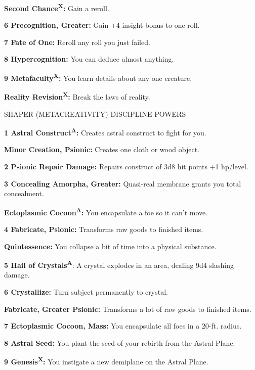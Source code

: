 \documentclass{article}
\begin{document}
\parindent=0pt
\textbf{Second Chance}\textsuperscript{\textbf{X}}\textbf{:} Gain a reroll.

\parindent=-15pt
\textbf{6 Precognition, Greater:} Gain +4 insight bonus to one roll.

\textbf{7 Fate of One:} Reroll any roll you just failed.

\textbf{8 Hypercognition:} You can deduce almost anything.

\textbf{9 Metafaculty}\textsuperscript{\textbf{X}}\textbf{:} You learn details 
about any one creature.

\parindent=0pt
\textbf{Reality Revision}\textsuperscript{\textbf{X}}\textbf{:} Break the laws 
of reality.

\vspace{12pt}
\parindent=-15pt
SHAPER (METACREATIVITY) DISCIPLINE POWERS

\textbf{1  Astral Construct}\textsuperscript{\textbf{A}}\textbf{:} Creates astral 
construct to fight for you.

\parindent=0pt
\textbf{Minor Creation, Psionic:} Creates one cloth or wood object.

\parindent=-15pt
\textbf{2  Psionic Repair Damage:} Repairs construct of 3d8 hit points +1 hp/level.

\textbf{3  Concealing Amorpha, Greater:} Quasi-real membrane grants you total concealment.

\parindent=0pt
\textbf{Ectoplasmic Cocoon}\textsuperscript{\textbf{A}}\textbf{:} You encapsulate 
a foe so it can't move.

\parindent=-15pt
\textbf{4  Fabricate, Psionic:} Transforms raw goods to finished items.

\parindent=0pt
\textbf{Quintessence:} You collapse a bit of time into a physical substance.

\parindent=-15pt
\textbf{5  Hail of Crystals}\textsuperscript{\textbf{A}}: A crystal explodes in 
an area, dealing 9d4 slashing damage.

\textbf{6  Crystallize:} Turn subject permanently to crystal.

\parindent=0pt
\textbf{Fabricate, Greater Psionic:} Transforms a lot of raw goods to finished 
items.

\parindent=-15pt
\textbf{7  Ectoplasmic Cocoon, Mass:} You encapsulate all foes in a 20-ft. radius.

\textbf{8  Astral Seed:} You plant the seed of your rebirth from the Astral Plane.

\textbf{9  Genesis}\textsuperscript{\textbf{X}}\textbf{:} You instigate a new demiplane 
on the Astral Plane.
\end{document}
